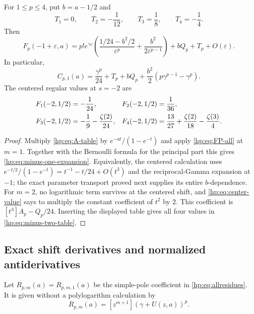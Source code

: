 \begin{corollary}
\label{hp:cor:minus-one}
For $1\le p\le4$, put $b=a-1/2$ and
\[
 T_1=0,\qquad T_2=-\frac1{12},\qquad
 T_3=\frac18,\qquad T_4=-\frac14.
\]
Then
\begin{equation}\label{hp:eq:minus-one-expansion}
 \boxed{\quad
 F_p(-1+\varepsilon,a)=p!e^{\gamma\varepsilon}
 \left(\frac{1/24-b^2/2}{\varepsilon^p}
               +\frac{b^2}{2\varepsilon^{p-1}}\right)
                  +bQ_p+T_p+O(\varepsilon).\quad}
\end{equation}
In particular,
\begin{equation}\label{hp:eq:minus-one-FP}
 C_{p,1}(a)=\frac{\gamma^p}{24}+T_p+bQ_p
                 +\frac{b^2}{2}(p\gamma^{p-1}-\gamma^p).
\end{equation}
The centered regular values at $s=-2$ are
\begin{align}\label{hp:eq:minus-two-table}
 F_1(-2,1/2)&=-\frac1{24},&
 F_2(-2,1/2)&=\frac1{36},\notag\\
 F_3(-2,1/2)&=-\frac19-\frac{\zeta(2)}{24},&
 F_4(-2,1/2)&=\frac{13}{27}+\frac{\zeta(2)}{18}
                                  -\frac{\zeta(3)}4.
\end{align}
\end{corollary}

\begin{proof}
Multiply \eqref{hp:eq:A-table} by
$e^{-at}/(1-e^{-t})$ and apply \eqref{hp:eq:FP-all} at $m=1$.
Together with the Bernoulli formula for the principal part this gives
\eqref{hp:eq:minus-one-expansion}. Equivalently, the centered calculation
uses $e^{-t/2}/(1-e^{-t})=t^{-1}-t/24+O(t^3)$ and the
reciprocal-Gamma expansion at $-1$; the exact parameter transport
proved next supplies its entire $b$-dependence.
For $m=2$, no logarithmic term survives at the centered shift, and
\eqref{hp:eq:center-value} says to multiply the constant coefficient
of $t^2$ by $2$. This coefficient is
$[t^3]A_p-Q_p/24$. Inserting the displayed table gives all four
values in \eqref{hp:eq:minus-two-table}.
\end{proof}

\subsection{Exact shift derivatives and normalized antiderivatives}

Let $R_{p,m}(a)=R_{p,m,1}(a)$ be the simple-pole coefficient in
\eqref{hp:eq:allresidues}. It is given without a polylogarithm
calculation by
\begin{equation}\label{hp:eq:residue-poly}
 R_{p,m}(a)=[z^{m+1}](\gamma+U(z,a))^p.
\end{equation}

